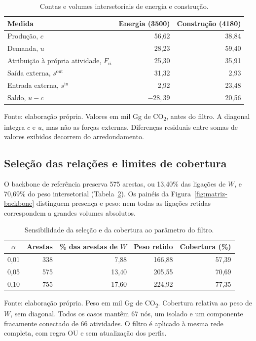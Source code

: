 \clearpage
\begin{table}[!ht]
\centering
\caption{Contas e volumes intersetoriais de energia e construção.}
\label{tab:contas-energia-construcao}
\small
\begin{tabular}{@{}lrr@{}}
\toprule
Medida & Energia (3500) & Construção (4180) \\
\midrule
Produção, $c$ & 56,62 & 38,84 \\
Demanda, $u$ & 28,23 & 59,40 \\
Atribuição à própria atividade, $F_{ii}$ & 25,30 & 35,91 \\
Saída externa, $s^{\mathrm{out}}$ & 31,32 & 2,93 \\
Entrada externa, $s^{\mathrm{in}}$ & 2,92 & 23,48 \\
Saldo, $u-c$ & $-28,39$ & 20,56 \\
\bottomrule
\end{tabular}
\par\smallskip\begin{minipage}{\textwidth}\footnotesize
Fonte: elaboração própria. Valores em mil Gg de CO\textsubscript{2}, antes do filtro. A diagonal integra $c$ e $u$, mas não as forças externas. Diferenças residuais entre somas de valores exibidos decorrem do arredondamento.
\end{minipage}
\end{table}



\subsection{Seleção das relações e limites de cobertura}

O backbone de referência preserva 575 arestas, ou 13,40\% das ligações de $W$, e 70,69\% do peso intersetorial (Tabela~\ref{tab:sensibilidade-backbone}). Os painéis da Figura~\ref{fig:matriz-backbone} distinguem presença e peso: nem todas as ligações retidas correspondem a grandes volumes absolutos.

\begin{table}[htbp]
\centering
\caption{Sensibilidade da seleção e da cobertura ao parâmetro do filtro.}
\label{tab:sensibilidade-backbone}
\small
\begin{tabular}{@{}crrrr@{}}
\toprule
$\alpha$ & Arestas & \% das arestas de $W$ & Peso retido & Cobertura (\%) \\
\midrule
0,01 & 338 & 7,88 & 166,88 & 57,39 \\
0,05 & 575 & 13,40 & 205,55 & 70,69 \\
0,10 & 755 & 17,60 & 224,92 & 77,35 \\
\bottomrule
\end{tabular}
\par\smallskip\begin{minipage}{\textwidth}\footnotesize
Fonte: elaboração própria. Peso em mil Gg de CO\textsubscript{2}. Cobertura relativa ao peso de $W$, sem diagonal. Todos os casos mantêm 67 nós, um isolado e um componente fracamente conectado de 66 atividades. O filtro é aplicado à mesma rede completa, com regra OU e sem atualização dos perfis.
\end{minipage}
\end{table}

